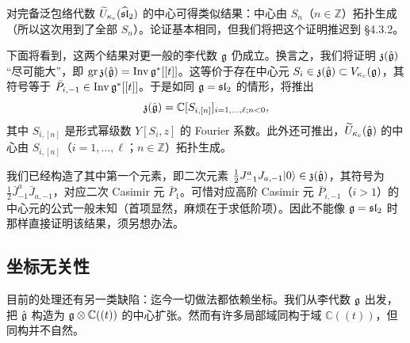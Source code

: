 

对完备泛包络代数 $\widetilde{U}_{\kappa_c}(\widehat{\mathfrak{sl}}_2)$ 的中心可得类似结果：中心由 $S_n$（$n\in\mathbb{Z}$）拓扑生成（所以这次用到了全部 $S_n$）。论证基本相同，但我们将把这个证明推迟到 §4.3.2。

下面将看到，这两个结果对更一般的李代数 $\mathfrak{g}$ 仍成立。换言之，我们将证明 $\mathfrak{z}(\hat{\mathfrak{g}})$ “尽可能大”，即 $\operatorname{gr}\mathfrak{z}(\hat{\mathfrak{g}})=\operatorname{Inv}\mathfrak{g}^*[[t]]$。这等价于存在中心元 $S_i\in\mathfrak{z}(\hat{\mathfrak{g}})\subset V_{\kappa_c}(\mathfrak{g})$，其符号等于 $\bar P_{i,-1}\in\operatorname{Inv}\mathfrak{g}^*[[t]]$。于是如同 $\mathfrak{g}=\mathfrak{sl}_2$ 的情形，将推出
\[
    \mathfrak{z}(\hat{\mathfrak{g}})=\mathbb{C}[S_{i,[n]}]_{i=1,\dots,\ell;n<0},
\]
其中 $S_{i,[n]}$ 是形式幂级数 $Y[S_i,z]$ 的 Fourier 系数。此外还可推出，$\widetilde{U}_{\kappa_c}(\hat{\mathfrak{g}})$ 的中心由 $S_{i,[n]}$（$i=1,\dots,\ell$；$n\in\mathbb{Z}$）拓扑生成。

我们已经构造了其中第一个元素，即二次元素 $\frac12 J^a_{-1}J_{a,-1}|0\rangle\in\mathfrak{z}(\hat{\mathfrak{g}})$，其符号为 $\frac12\bar J^a_{-1}\bar J_{a,-1}$，对应二次 Casimir 元 $\bar P_1$。可惜对应高阶 Casimir 元 $\bar P_{i,-1}$（$i>1$）的中心元的公式一般未知（首项显然，麻烦在于求低阶项）。因此不能像 $\mathfrak{g}=\mathfrak{sl}_2$ 时那样直接证明该结果，须另想办法。

\subsection{坐标无关性}

目前的处理还有另一类缺陷：迄今一切做法都依赖坐标。我们从李代数 $\mathfrak{g}$ 出发，把 $\hat{\mathfrak{g}}$ 构造为 $\mathfrak{g}\otimes\mathbb{C}((t))$ 的中心扩张。然而有许多局部域同构于域 $\mathbb{C}((t))$，但同构并不自然。


